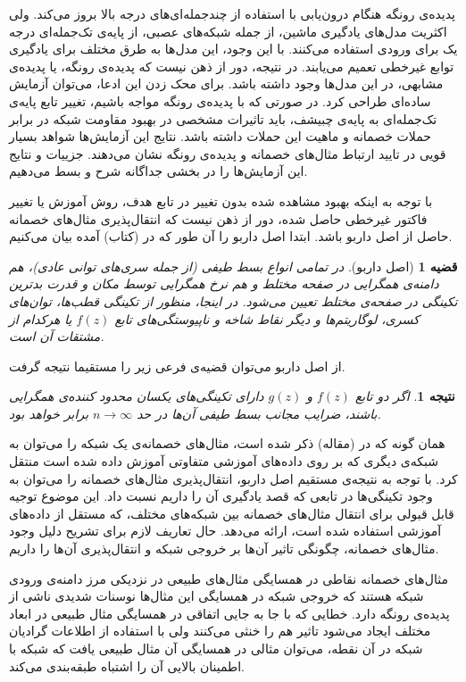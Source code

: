 \documentclass[12pt,onecolumn,a4paper]{article}
\newtheorem{theorem}{قضیه}[section]
\newtheorem{corollary}{نتیجه‌}[theorem]
\begin{document}
پدیده‌ی رونگه هنگام درون‌یابی با استفاده از چندجمله‌ای‌های درجه بالا بروز می‌کند. ولی اکثریت مدل‌های یادگیری ماشین، از جمله شبکه‌های عصبی، از پایه‌ی تک‌جمله‌ای درجه یک برای ورودی استفاده می‌کنند. با این وجود، این مدل‌ها به طرق مختلف برای یادگیری توابع غیرخطی تعمیم می‌یابند. در نتیجه، دور از ذهن نیست که پدیده‌ی رونگه، یا پدیده‌ی مشابهی، در این مدل‌ها وجود داشته باشد. برای محک زدن این ادعا، می‌توان آزمایش ساده‌ای طراحی کرد. در صورتی که با پدیده‌ی رونگه مواجه باشیم، تغییر تابع پایه‌ی تک‌جمله‌ای به پایه‌ی چبیشف، باید تاثیرات مشخصی در بهبود مقاومت شبکه در برابر حملات خصمانه و ماهیت این حملات داشته باشد. نتایج این آزمایش‌ها شواهد بسیار قویی در تایید ارتباط مثال‌های خصمانه و پدیده‌ی رونگه نشان می‌دهند. جزییات و نتایج این آزمایش‌ها را در بخشی جداگانه شرح و بسط می‌دهیم.

با توجه به اینکه بهبود مشاهده شده بدون تغییر در تابع هدف، روش آموزش یا تغییر فاکتور غیرخطی حاصل شده، دور از ذهن نیست که انتقال‌پذیری مثال‌های خصمانه حاصل از اصل داربو باشد. ابتدا اصل داربو را آن طور که در (کتاب) آمده بیان می‌کنیم.
\begin{theorem}[اصل داربو]
    در تمامی انواع بسط طیفی (از جمله سری‌های توانی عادی)، هم دامنه‌ی همگرایی در صفحه مختلط و هم نرخ همگرایی توسط مکان و قدرت بدترین تکینگی در صفحه‌ی مختلط تعیین می‌شود. در اینجا، منظور از تکینگی قطب‌ها، توان‌های کسری، لوگاریتم‌ها و دیگر نقاط شاخه و ناپیوستگی‌های تابع 
    $f(z)$ 
    یا هرکدام از مشتقات آن است.
\end{theorem}

از اصل داربو می‌توان قضیه‌ی فرعی زیر را مستقیما نتیجه گرفت.

\begin{corollary}
    اگر دو تابع 
    $f(z)$ 
    و 
    $g(z)$ 
    دارای تکینگی‌های یکسان محدود کننده‌ی همگرایی باشند، ضرایب مجانب بسط طیفی آن‌ها در حد
    $n \rightarrow \infty$ 
    برابر خواهد بود.
\end{corollary}

همان گونه که در (مقاله) ذکر شده است، مثال‌های خصمانه‌ی یک شبکه را می‌توان به شبکه‌ی دیگری که بر روی داده‌های آموزشی متفاوتی آموزش داده شده است منتقل کرد. با توجه به نتیجه‌ی مستقیم اصل داربو، انتقال‌پذیری مثال‌های خصمانه را می‌توان به وجود تکینگی‌ها در تابعی که قصد یادگیری آن را داریم نسبت داد. این موضوع توجیه قابل قبولی برای انتقال مثال‌های خصمانه بین شبکه‌های مختلف، که مستقل از داده‌های آموزشی استفاده شده است، ارائه می‌دهد. حال تعاریف لازم برای تشریح دلیل وجود مثال‌های خصمانه، چگونگی تاثیر آن‌ها بر خروجی شبکه و انتقال‌پذیری آن‌ها را داریم.

مثال‌های خصمانه نقاطی در همسایگی مثال‌های طبیعی در نزدیکی مرز دامنه‌ی ورودی شبکه هستند که خروجی شبکه در همسایگی این مثال‌ها نوسنات شدیدی ناشی از پدیده‌ی رونگه دارد. خطایی که با جا به جایی اتفاقی در همسایگی مثال طبیعی در ابعاد مختلف ایجاد می‌شود تاثیر هم را خنثی می‌کنند ولی با استفاده از اطلاعات گرادیان شبکه در آن نقطه، می‌توان مثالی در همسایگی آن مثال طبیعی یافت که شبکه با اطمینان بالایی آن را اشتباه طبقه‌بندی می‌کند.
\end{document}
